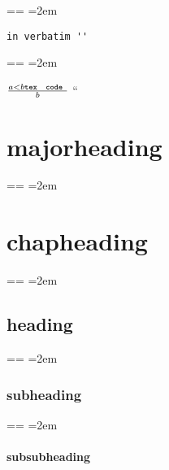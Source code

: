\documentclass{book}
\makeatletter
\newenvironment{GNUTexinfopreformatted}{%
  \par\obeylines\obeyspaces\frenchspacing
  \parskip=\z@\parindent=\z@}{}
\newcommand{\GNUTexinfoplaceholder}[1]{}
\newcommand{\GNUTexinfonopagebreakheading}[2]{\let\clearpage\relax \let\cleardoublepage\relax \let\thispagestyle\GNUTexinfoplaceholder #1{#2}}
\makeatother
\begin{document}
\begin{GNUTexinfopreformatted}
\leftskip=2em\relax\ttfamily%

\end{GNUTexinfopreformatted}
\begin{verbatim}
in verbatim ''
\end{verbatim}
\begin{GNUTexinfopreformatted}
\leftskip=2em\relax\ttfamily%





$\frac{a < b \texttt{tex \hbox{ code }}}{b}$ ``

\end{GNUTexinfopreformatted}
\GNUTexinfonopagebreakheading{\chapter*}{{majorheading}}
\begin{GNUTexinfopreformatted}
\leftskip=2em\relax\ttfamily%

\end{GNUTexinfopreformatted}
\GNUTexinfonopagebreakheading{\chapter*}{{chapheading}}
\begin{GNUTexinfopreformatted}
\leftskip=2em\relax\ttfamily%

\end{GNUTexinfopreformatted}
\GNUTexinfonopagebreakheading{\section*}{{heading}}
\begin{GNUTexinfopreformatted}
\leftskip=2em\relax\ttfamily%

\end{GNUTexinfopreformatted}
\GNUTexinfonopagebreakheading{\subsection*}{{subheading}}
\begin{GNUTexinfopreformatted}
\leftskip=2em\relax\ttfamily%

\end{GNUTexinfopreformatted}
\GNUTexinfonopagebreakheading{\subsubsection*}{{subsubheading}}
\end{document}
